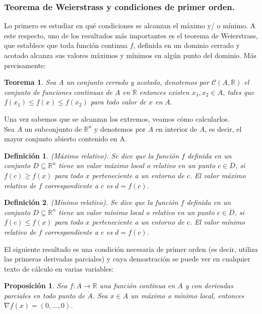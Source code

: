 \documentclass[a4paper,11pt]{article}
\newtheorem{theorem}{Teorema}
\newtheorem{proposition}{Proposición}
\newtheorem{definition}{Definición}
\begin{document}
\subsubsection{Teorema
de Weierstrass y condiciones de primer orden.}
Lo primero es estudiar en qué condiciones se alcanzan el máximo y/ o mínimo.
A este respecto, uno de los resultados más importantes es el teorema de Weierstrass, que establece que toda función continua $f$, definida en un dominio cerrado
y acotado alcanza sus valores máximos y mínimos en algún punto del dominio.
Más precisamente:
\begin{theorem}
Sea A un conjunto cerrado y acotado, denotemos por $\mathcal{C}(A,\mathbb{R})$  el conjunto de funciones continuas de $A$ en $\mathbb{R}$ entonces existen $ x_{1},x_{2} \in A$, tales que $ f(x_{1}) \leq f(x) \leq f(x_{2})$ para todo valor de $x$ en $A$.
\end{theorem}
\noindent
Una vez sabemos que se alcanzan los extremos, veamos cómo calcularlos.
\\Sea $A$ un subconjunto de $\mathbb{R}^n$ y denotemos por $\mathring{A}$ en interior de $A$, es decir, el mayor conjunto abierto contenido en A.
\begin{definition}
(Máximo relativo). Se dice que la función $f$ definida en un conjunto $D\subseteq \mathbb{R}^n$ tiene un valor máximo local o relativo en un punto $c\in\mathring{D}$, si $f(c)\geq f(x)$ para todo $x$ perteneciente a un entorno de $c$. El valor máximo relativo de $f$ correspondiente a $c$ es $d = f(c)$.
\end{definition}
\begin{definition}
(Mínimo relativo). Se dice que la función $f$ definida en un conjunto $D\subseteq \mathbb{R}^n$ tiene un valor mínimo local o relativo en un punto $c\in\mathring{D}$, si $f(c)\leq f(x)$ para todo $x$ perteneciente a un entorno de $c$. El valor mínimo relativo de $f$ correspondiente a $c$ es $d = f(c)$.
\end{definition}
El siguiente resultado es una condición necesaria de primer orden (es decir,
utiliza las primeras derivadas parciales) y cuya demostración se puede ver en
cualquier texto de cálculo en varias variables:

\begin{proposition}
Sea $ f : A \rightarrow \mathbb{R}$ una función continua en $A$ y con derivadas
parciales en todo punto de $\mathring{A}$. Sea $x\in A$ un máximo o mínimo local,
entonces $\nabla f(x)=(0,...,0)$.

\end{proposition}
\end{document}
